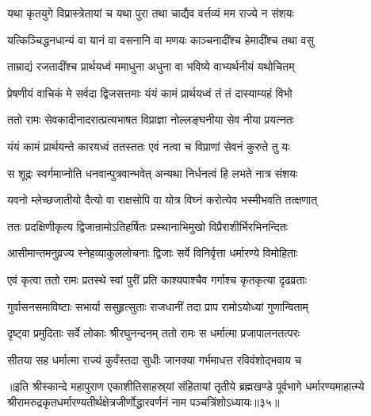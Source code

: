 \twolineshloka
{यथा कृतयुगे विप्रास्त्रेतायां च यथा पुरा}
{तथा चाद्यैव वर्त्तव्यं मम राज्ये न संशयः}%

\twolineshloka
{यत्किञ्चिद्धनधान्यं वा यानं वा वसनानि वा}
{मणयः काञ्चनादींश्च हेमादींश्च तथा वसु}%

\twolineshloka
{ताम्राद्यं रजतादींश्च प्रार्थयध्वं ममाधुना}
{अधुना वा भविष्ये वाभ्यर्थनीयं यथोचितम्}%

\twolineshloka
{प्रेषणीयं वाचिकं मे सर्वदा द्विजसत्तमाः}
{यंयं कामं प्रार्थयध्वं तं तं दास्याम्यहं विभो}%

\twolineshloka
{ततो रामः सेवकादीनादरात्प्रत्यभाषत}
{विप्राज्ञा नोल्लङ्घनीया सेव नीया प्रयत्नतः}%

\twolineshloka
{यंयं कामं प्रार्थयन्ते कारयध्वं ततस्ततः}
{एवं नत्वा च विप्राणां सेवनं कुरुते तु यः}%

\twolineshloka
{स शूद्रः स्वर्गमाप्नोति धनवान्पुत्रवान्भवेत्}
{अन्यथा निर्धनत्वं हि लभते नात्र संशयः}%

\twolineshloka
{यवनो म्लेच्छजातीयो दैत्यो वा राक्षसोपि वा}
{योत्र विघ्नं करोत्येव भस्मीभवति तत्क्षणात्}%


\twolineshloka
{ततः प्रदक्षिणीकृत्य द्विजान्रामोऽतिहर्षितः}
{प्रस्थानाभिमुखो विप्रैराशीर्भिरभिनन्दितः}%

\twolineshloka
{आसीमान्तमनुव्रज्य स्नेहव्याकुललोचनाः}
{द्विजाः सर्वे विनिर्वृत्ता धर्मारण्ये विमोहिताः}%

\twolineshloka
{एवं कृत्वा ततो रामः प्रतस्थे स्वां पुरीं प्रति}
{काश्यपाश्चैव गर्गाश्च कृतकृत्या दृढव्रताः}%

\twolineshloka
{गुर्वासनसमाविष्टाः सभार्या ससुहृत्सुताः}
{राजधानीं तदा प्राप रामोऽयोध्यां गुणान्विताम्}%

\twolineshloka
{दृष्ट्वा प्रमुदिताः सर्वे लोकाः श्रीरघुनन्दनम्}
{ततो रामः स धर्मात्मा प्रजापालनतत्परः}%

\twolineshloka
{सीतया सह धर्मात्मा राज्यं कुर्वंस्तदा सुधीः}
{जानक्या गर्भमाधत्त रविवंशोद्भवाय च}%

॥इति श्रीस्कान्दे महापुराण एकाशीतिसाहस्र्यां संहितायां तृतीये ब्रह्मखण्डे पूर्वभागे धर्मारण्यमाहात्म्ये श्रीरामरुद्रकृतधर्मारण्यतीर्थक्षेत्रजीर्णोद्धारवर्णनं नाम पञ्चत्रिंशोऽध्यायः॥३५॥